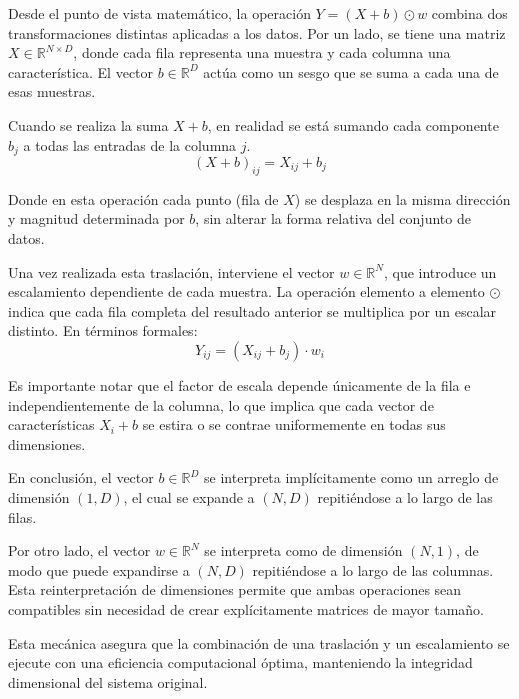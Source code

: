 \documentclass[12pt]{article}
\begin{document}
Desde el punto de vista matemático, la operación $Y = (X + b) \odot w$ combina dos transformaciones distintas aplicadas a los datos. Por un lado, se tiene una matriz $X \in \mathbb{R}^{N \times D}$, donde cada fila representa una muestra y cada columna una característica. El vector $b \in \mathbb{R}^D$ actúa como un sesgo que se suma a cada una de esas muestras.

Cuando se realiza la suma $X + b$, en realidad se está sumando cada componente $b_j$ a todas las entradas de la columna $j$. 
$$
    (X + b)_{ij} = X_{ij} + b_j
$$

Donde en esta operación cada punto (fila de $X$) se desplaza en la misma dirección y magnitud determinada por $b$, sin alterar la forma relativa del conjunto de datos.

Una vez realizada esta traslación, interviene el vector $w \in \mathbb{R}^N$, que introduce un escalamiento dependiente de cada muestra. La operación elemento a elemento $\odot$ indica que cada fila completa del resultado anterior se multiplica por un escalar distinto. En términos formales:
$$
    Y_{ij} = (X_{ij} + b_j) \cdot w_i
$$

Es importante notar que el factor de escala depende únicamente de la fila e independientemente de la columna, lo que implica que cada vector de características $X_i + b$ se estira o se contrae uniformemente en todas sus dimensiones.


En conclusión, el vector $b \in \mathbb{R}^D$ se interpreta implícitamente como un arreglo de dimensión $(1, D)$, el cual se expande a $(N, D)$ repitiéndose a lo largo de las filas. 

Por otro lado, el vector $w \in \mathbb{R}^N$ se interpreta como de dimensión $(N, 1)$, de modo que puede expandirse a $(N, D)$ repitiéndose a lo largo de las columnas. Esta reinterpretación de dimensiones permite que ambas operaciones sean compatibles sin necesidad de crear explícitamente matrices de mayor tamaño.

Esta mecánica asegura que la combinación de una traslación y un escalamiento se ejecute con una eficiencia computacional óptima, manteniendo la integridad dimensional del sistema original.
\end{document}

